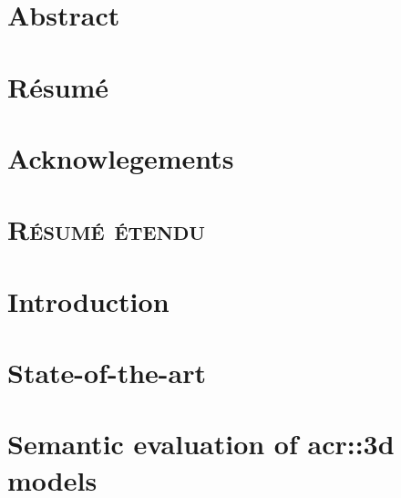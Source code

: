 \documentclass[12pt, twoside]{book}
\begin{document}
    \dominitoc
    \doparttoc
    \frontmatter
    \pagestyle{plain}
   
    
    
    
    \chapter{Abstract}
        \adjustmtc
        
    \chapter{Résumé}
        \adjustmtc
        

    \tableofcontents
    \listoffigures
    \listoftables

    \chapter{Acknowlegements}
        \adjustmtc
        

    \mainmatter

    \chapter*{\textsc{Résumé étendu}}
        \adjustmtc
        

    \chapter{Introduction}
        \label{chap::introduction}
        
    
    \chapter{State-of-the-art}
        \label{chap::state_of_the_art}
        

    \chapter{Semantic evaluation of \texorpdfstring{\gls*{acr::3d}}{3D} models}
        \label{chap::semantic_evaluation}
        
\end{document}
